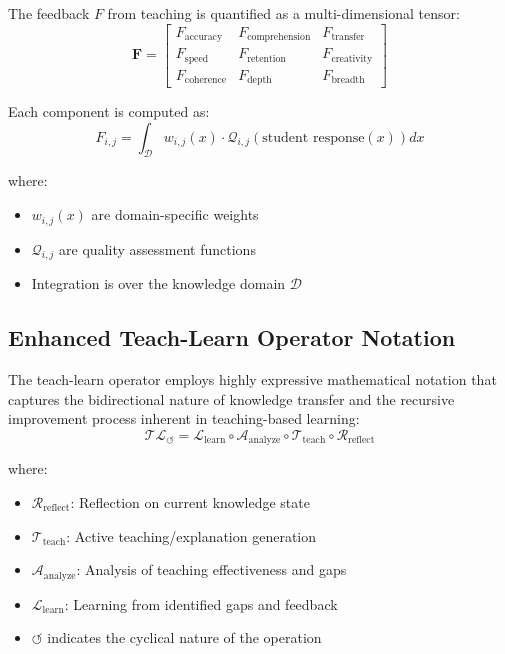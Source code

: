The feedback $F$ from teaching is quantified as a multi-dimensional tensor:
\begin{equation}
\mathbf{F} = \begin{bmatrix}
F_{\text{accuracy}} & F_{\text{comprehension}} & F_{\text{transfer}} \\
F_{\text{speed}} & F_{\text{retention}} & F_{\text{creativity}} \\
F_{\text{coherence}} & F_{\text{depth}} & F_{\text{breadth}}
\end{bmatrix}
\end{equation}

Each component is computed as:
\begin{equation}
F_{i,j} = \int_{\mathcal{D}} w_{i,j}(x) \cdot \mathcal{Q}_{i,j}(\text{student response}(x)) dx
\end{equation}

where:
\begin{itemize}
    \item $w_{i,j}(x)$ are domain-specific weights
    \item $\mathcal{Q}_{i,j}$ are quality assessment functions
    \item Integration is over the knowledge domain $\mathcal{D}$
\end{itemize}

\subsection{Enhanced Teach-Learn Operator Notation}

The teach-learn operator employs highly expressive mathematical notation that captures the bidirectional nature of knowledge transfer and the recursive improvement process inherent in teaching-based learning:
\begin{equation}
\mathcal{T}\mathcal{L}_{\circlearrowleft} = \mathcal{L}_{\text{learn}} \circ \mathcal{A}_{\text{analyze}} \circ \mathcal{T}_{\text{teach}} \circ \mathcal{R}_{\text{reflect}}
\end{equation}

where:
\begin{itemize}
    \item $\mathcal{R}_{\text{reflect}}$: Reflection on current knowledge state
    \item $\mathcal{T}_{\text{teach}}$: Active teaching/explanation generation
    \item $\mathcal{A}_{\text{analyze}}$: Analysis of teaching effectiveness and gaps
    \item $\mathcal{L}_{\text{learn}}$: Learning from identified gaps and feedback
    \item $\circlearrowleft$ indicates the cyclical nature of the operation
\end{itemize}


